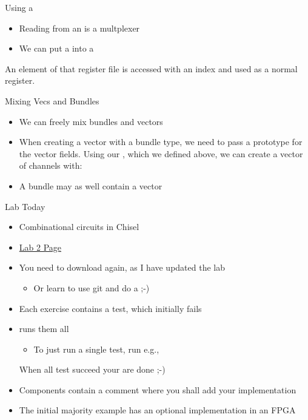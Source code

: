 \begin{frame}[fragile]{Using a }
\begin{itemize}
\item Reading from an  is a multplexer
\item We can put a  into a 
\end{itemize}
\noindent An element of that register file is accessed with an index and used as a normal register.

\end{frame}


\begin{frame}[fragile]{Mixing Vecs and Bundles}
\begin{itemize}
\item We can freely mix bundles and vectors
\item When creating a vector with a bundle
type, we need to pass a prototype for the vector fields. Using our
, which we defined above, we can create a vector of channels with:
\end{itemize}
\begin{itemize}
\item A bundle may as well contain a vector
\end{itemize}
\end{frame}

\begin{frame}[fragile]{Lab Today}
\begin{itemize}
\item Combinational circuits in Chisel
\item \href{https://github.com/schoeberl/chisel-lab/tree/master/lab2}{Lab 2 Page}
\item You need to download again, as I have updated the lab
\begin{itemize}
\item Or learn to use git and do a   ;-)
\end{itemize}
\item Each exercise contains a test, which initially fails
\item {} runs them all
\begin{itemize}
\item To just run a single test, run e.g.,\\
\end{itemize}
When all test succeed your are done ;-)
\item Components contain a comment where you shall add your implementation
\item The initial majority example has an optional implementation in an FPGA
\end{itemize}
\end{frame}

